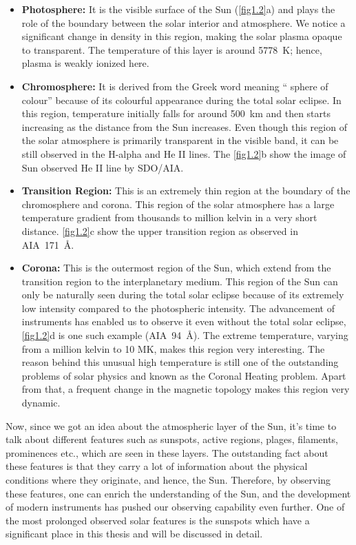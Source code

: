 \begin{itemize}
    
    \item {\bf Photosphere:} It is the visible surface of the Sun (\autoref{fig1.2}a) and plays the role of the boundary between the solar interior and atmosphere. We notice a significant change in density in this region, making the solar plasma opaque to transparent. The temperature of this layer is around 5778~K; hence, plasma is weakly ionized here.
    
    \item {\bf Chromosphere:} It is derived from the Greek word meaning `` sphere of colour'' because of its colourful appearance during the total solar eclipse. In this region, temperature initially falls for around 500~km and then starts increasing as the distance from the Sun increases. Even though this region of the solar atmosphere is primarily transparent in the visible band, it can be still observed in the H-alpha and He II lines. The \autoref{fig1.2}b show the image of Sun observed He II line by SDO/AIA. 
    
    \item {\bf Transition Region:} This is an extremely thin region at the boundary of the chromosphere and corona. This region of the solar atmosphere has a large temperature gradient from thousands to million kelvin in a very short distance. \autoref{fig1.2}c show the upper transition region as observed in AIA~171~\AA.
    
    \item {\bf Corona:} This is the outermost region of the Sun, which extend from the transition region to the interplanetary medium. This region of the Sun can only be naturally seen during the total solar eclipse because of its extremely low intensity compared to the photospheric intensity. The advancement of instruments has enabled us to observe it even without the total solar eclipse, \autoref{fig1.2}d is one such example (AIA~94~\AA). The extreme temperature, varying from a million kelvin to 10 MK, makes this region very interesting. The reason behind this unusual high temperature is still one of the outstanding problems of solar physics and known as the Coronal Heating problem. Apart from that, a frequent change in the magnetic topology makes this region very dynamic.
\end{itemize}


Now, since we got an idea about the atmospheric layer of the Sun, it's time to talk about different features such as sunspots, active regions, plages, filaments, prominences etc., which are seen in these layers. The outstanding fact about these features is that they carry a lot of information about the physical conditions where they originate, and hence, the Sun. Therefore, by observing these features, one can enrich the understanding of the Sun, and the development of modern instruments has pushed our observing capability even further. One of the most prolonged observed solar features is the sunspots which have a significant place in this thesis and will be discussed in detail.


